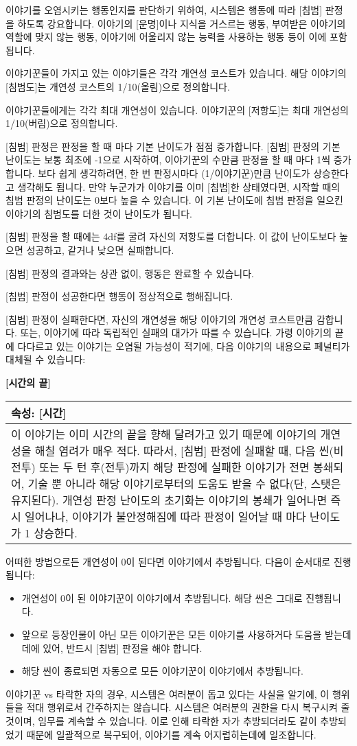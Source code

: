 \documentclass[12pt]{report}
\newenvironment{story}[2]
{\begin{center}
		{\large \textbf{[#1]}}\\[1ex]
		\begin{tabular}{|p{\textwidth}|}
			\hline
			\textbf{속성}: #2
			\\
			\hline
		}
		{ 
			\\\hline
		\end{tabular}
	\end{center}
}
\begin{document}
	이야기를 오염시키는 행동인지를 판단하기 위하여, 시스템은 행동에 따라 [침범] 판정을 하도록 강요합니다. 이야기의 [운명]이나 지식을 거스르는 행동, 부여받은 이야기의 역할에 맞지 않는 행동, 이야기에 어울리지 않는 능력을 사용하는 행동 등이 이에 포함됩니다.
	
	이야기꾼들이 가지고 있는 이야기들은 각각 개연성 코스트가 있습니다. 해당 이야기의 [침범도]는 개연성 코스트의 1/10(올림)으로 정의합니다.
	
	이야기꾼들에게는 각각 최대 개연성이 있습니다. 이야기꾼의 [저항도]는 최대 개연성의 1/10(버림)으로 정의합니다.
	
	\bigskip
	
	[침범] 판정은 판정을 할 때 마다 기본 난이도가 점점 증가합니다. [침범] 판정의 기본 난이도는 보통 최초에 -1으로 시작하여, 이야기꾼의 수만큼 판정을 할 때 마다 1씩 증가합니다. 보다 쉽게 생각하려면, 한 번 판정시마다 (1/이야기꾼)만큼 난이도가 상승한다고 생각해도 됩니다. 만약 누군가가 이야기를 이미 [침범]한 상태였다면, 시작할 때의 침범 판정의 난이도는 0보다 높을 수 있습니다. 이 기본 난이도에 침범 판정을 일으킨 이야기의 침범도를 더한 것이 난이도가 됩니다.
	
	[침범] 판정을 할 때에는 4df를 굴려 자신의 저항도를 더합니다. 이 값이 난이도보다 높으면 성공하고, 같거나 낮으면 실패합니다.
	
	[침범] 판정의 결과와는 상관 없이, 행동은 완료할 수 있습니다.
	
	[침범] 판정이 성공한다면 행동이 정상적으로 행해집니다.
	
	[침범] 판정이 실패한다면, 자신의 개연성을 해당 이야기의 개연성 코스트만큼 감합니다. 또는, 이야기에 따라 독립적인 실패의 대가가 따를 수 있습니다. 가령 이야기의 끝에 다다르고 있는 이야기는 오염될 가능성이 적기에, 다음 이야기의 내용으로 페널티가 대체될 수 있습니다:
	\begin{story}{시간의 끝}{[시간]}
		이 이야기는 이미 시간의 끝을 향해 달려가고 있기 때문에 이야기의 개연성을 해칠 염려가 매우 적다. 따라서, [침범] 판정에 실패할 때, 다음 씬(비전투) 또는 두 턴 후(전투)까지 해당 판정에 실패한 이야기가 전면 봉쇄되어, 기술 뿐 아니라 해당 이야기로부터의 도움도 받을 수 없다(단, 스탯은 유지된다). 개연성 판정 난이도의 초기화는 이야기의 봉쇄가 일어나면 즉시 일어나나, 이야기가 불안정해짐에 따라 판정이 일어날 때 마다 난이도가 1 상승한다.
	\end{story}
	
	어떠한 방법으로든 개연성이 0이 된다면 이야기에서 추방됩니다. 다음이 순서대로 진행됩니다:
	\begin{itemize}
		\item 개연성이 0이 된 이야기꾼이 이야기에서 추방됩니다. 해당 씬은 그대로 진행됩니다.
		\item 앞으로 등장인물이 아닌 모든 이야기꾼은 모든 이야기를 사용하거다 도움을 받는데데에 있어, 반드시 [침범] 판정을 해야 합니다.
		\item 해당 씬이 종료되면 자동으로 모든 이야기꾼이 이야기에서 추방됩니다.
	\end{itemize}
	이야기꾼 vs 타락한 자의 경우, 시스템은 여러분이 돕고 있다는 사실을 알기에, 이 행위들을 적대 행위로서 간주하지는 않습니다. 시스템은 여러분의 권한을 다시 복구시켜 줄 것이며, 임무를 계속할 수 있습니다. 이로 인해 타락한 자가 추방되더라도 같이 추방되었기 때문에 일괄적으로 복구되어, 이야기를 계속 어지럽히는데에 일조합니다.
	
\end{document}
